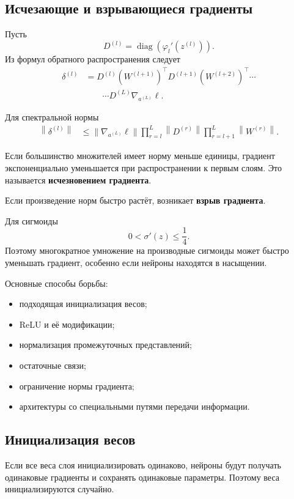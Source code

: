\documentclass[12pt,a4paper]{article}
\theoremstyle{plain}
\theoremstyle{definition}
\theoremstyle{remark}
\newcommand{\norm}[1]{\left\lVert #1 \right\rVert}
\newcommand{\diag}{\operatorname{diag}}
\begin{document}
\subsection{Исчезающие и взрывающиеся градиенты}

Пусть
\[
    D^{(l)}
    =
    \diag\left(
        \varphi_l'(z^{(l)})
    \right).
\]
Из формул обратного распространения следует
\[
\begin{aligned}
    \delta^{(l)}
    &=
    D^{(l)}
    (W^{(l+1)})^\top
    D^{(l+1)}
    (W^{(l+2)})^\top
    \cdots\\
    &\qquad\cdots
    D^{(L)}
    \nabla_{a^{(L)}}\ell.
\end{aligned}
\]

Для спектральной нормы
\[
\begin{aligned}
    \norm{\delta^{(l)}}
    &\leq
    \norm{\nabla_{a^{(L)}}\ell}
    \prod_{r=l}^{L}\norm{D^{(r)}}
    \prod_{r=l+1}^{L}\norm{W^{(r)}}.
\end{aligned}
\]

Если большинство множителей имеет норму меньше единицы, градиент
экспоненциально уменьшается при распространении к первым слоям.
Это называется \textbf{исчезновением градиента}.

Если произведение норм быстро растёт, возникает
\textbf{взрыв градиента}.

Для сигмоиды
\[
    0<\sigma'(z)\leq\frac{1}{4}.
\]
Поэтому многократное умножение на производные сигмоиды может быстро
уменьшать градиент, особенно если нейроны находятся в насыщении.

Основные способы борьбы:

\begin{itemize}
    \item подходящая инициализация весов;
    \item ReLU и её модификации;
    \item нормализация промежуточных представлений;
    \item остаточные связи;
    \item ограничение нормы градиента;
    \item архитектуры со специальными путями передачи информации.
\end{itemize}

\subsection{Инициализация весов}

Если все веса слоя инициализировать одинаково, нейроны будут
получать одинаковые градиенты и сохранять одинаковые параметры.
Поэтому веса инициализируются случайно.
\end{document}

